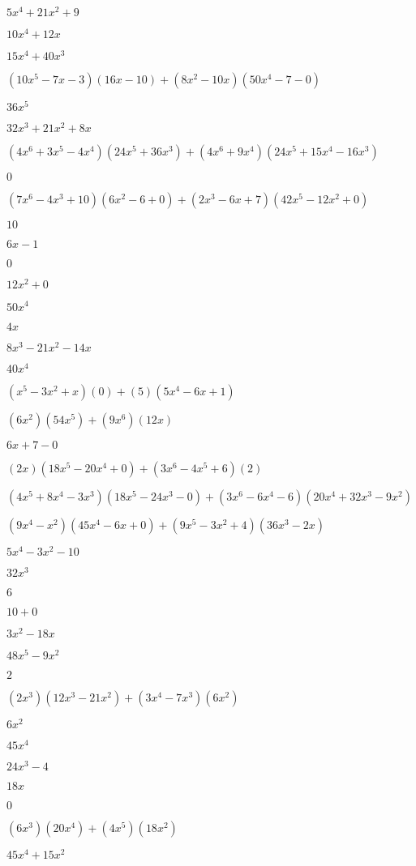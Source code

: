 \documentclass{article}
\begin{document}
\begin{multicols}{2}
$5x^{4}+21x^{2}+9$\item $10x^{4}+12x$\item $15x^{4}+40x^{3}$\item $(10x^{5}-7x-3)(16x-10)+(8x^2-10x)(50x^{4}-7-0)$\item $36x^{5}$\item $32x^{3}+21x^{2}+8x$\item $(4x^{6}+3x^{5}-4x^{4})(24x^{5}+36x^{3})+(4x^{6}+9x^{4})(24x^{5}+15x^{4}-16x^{3})$\item $0$\item $(7x^{6}-4x^{3}+10)(6x^{2}-6+0)+(2x^{3}-6x+7)(42x^{5}-12x^{2}+0)$\item $10$\item $6x-1$\item $0$\item $12x^{2}+0$\item $50x^{4}$\item $4x$\item $8x^{3}-21x^{2}-14x$\item $40x^{4}$\item $(x^{5}-3x^2+x)(0)+(5)(5x^{4}-6x+1)$\item $(6x^2)(54x^{5})+(9x^{6})(12x)$\item $6x+7-0$\item $(2x)(18x^{5}-20x^{4}+0)+(3x^{6}-4x^{5}+6)(2)$\item $(4x^{5}+8x^{4}-3x^{3})(18x^{5}-24x^{3}-0)+(3x^{6}-6x^{4}-6)(20x^{4}+32x^{3}-9x^{2})$\item $(9x^{4}-x^2)(45x^{4}-6x+0)+(9x^{5}-3x^2+4)(36x^{3}-2x)$\item $5x^{4}-3x^{2}-10$\item $32x^{3}$\item $6$\item $10+0$\item $3x^{2}-18x$\item $48x^{5}-9x^{2}$\item $2$\item $(2x^{3})(12x^{3}-21x^{2})+(3x^{4}-7x^{3})(6x^{2})$\item $6x^{2}$\item $45x^{4}$\item $24x^{3}-4$\item $18x$\item $0$\item $(6x^{3})(20x^{4})+(4x^{5})(18x^{2})$\item $45x^{4}+15x^{2}$\item 
\end{multicols}
\end{document}
